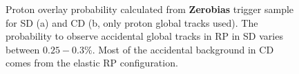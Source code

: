 \begin{figure}[H]
	\centering
	\parbox{0.48\textwidth}{
		\centering
		\begin{subfigure}[b]{\linewidth}{
				}
		\end{subfigure}
	}
	\quad
	\parbox{0.48\textwidth}{
		\centering
		\begin{subfigure}[b]{\linewidth}{
				}
		\end{subfigure}
	}%
	\caption[Proton overlay probability calculated from \textbf{Zerobias} trigger sample for SD and CD]{Proton overlay probability calculated from \textbf{Zerobias} trigger sample for SD (a) and CD (b, only proton global tracks used). The probability to observe accidental global tracks in RP in SD varies between $0.25-0.3\%$. Most of the accidental background in CD comes from the elastic RP configuration.}
	
\end{figure}
